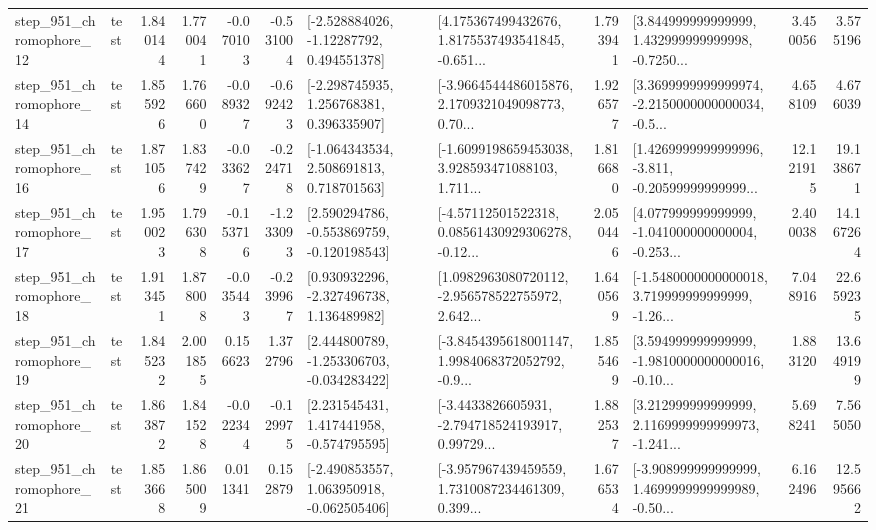 \begin{tabular}{llrrrrllrlrr}
  step\_951\_chromophore\_12 &      test &      1.840144 &    1.770041 &     -0.070103 & -0.531004 &    [-2.528884026, -1.12287792, 0.494551378] &  [4.175367499432676, 1.8175537493541845, -0.651... &       1.793941 &  [3.844999999999999, 1.432999999999998, -0.7250... &            3.450056 &          3.575196 \\
  step\_951\_chromophore\_14 &      test &      1.855926 &    1.766600 &     -0.089327 & -0.692423 &    [-2.298745935, 1.256768381, 0.396335907] &  [-3.9664544486015876, 2.1709321049098773, 0.70... &       1.926577 &  [3.3699999999999974, -2.2150000000000034, -0.5... &            4.658109 &          4.676039 \\
  step\_951\_chromophore\_16 &      test &      1.871056 &    1.837429 &     -0.033627 & -0.224718 &    [-1.064343534, 2.508691813, 0.718701563] &  [-1.6099198659453038, 3.928593471088103, 1.711... &       1.816680 &  [1.4269999999999996, -3.811, -0.20599999999999... &           12.121915 &         19.138671 \\
  step\_951\_chromophore\_17 &      test &      1.950023 &    1.796308 &     -0.153716 & -1.233093 &   [2.590294786, -0.553869759, -0.120198543] &  [-4.57112501522318, 0.08561430929306278, -0.12... &       2.050446 &  [4.077999999999999, -1.041000000000004, -0.253... &            2.400038 &         14.167264 \\
  step\_951\_chromophore\_18 &      test &      1.913451 &    1.878008 &     -0.035443 & -0.239967 &    [0.930932296, -2.327496738, 1.136489982] &  [1.0982963080720112, -2.956578522755972, 2.642... &       1.640569 &  [-1.5480000000000018, 3.719999999999999, -1.26... &            7.048916 &         22.659235 \\
  step\_951\_chromophore\_19 &      test &      1.845232 &    2.001855 &      0.156623 &  1.372796 &   [2.444800789, -1.253306703, -0.034283422] &  [-3.8454395618001147, 1.9984068372052792, -0.9... &       1.855469 &  [3.594999999999999, -1.9810000000000016, -0.10... &            1.883120 &         13.649199 \\
  step\_951\_chromophore\_20 &      test &      1.863872 &    1.841528 &     -0.022344 & -0.129975 &    [2.231545431, 1.417441958, -0.574795595] &  [-3.4433826605931, -2.794718524193917, 0.99729... &       1.882537 &  [3.212999999999999, 2.1169999999999973, -1.241... &            5.698241 &          7.565050 \\
  step\_951\_chromophore\_21 &      test &      1.853668 &    1.865009 &      0.011341 &  0.152879 &   [-2.490853557, 1.063950918, -0.062505406] &  [-3.957967439459559, 1.7310087234461309, 0.399... &       1.676534 &  [-3.908999999999999, 1.4699999999999989, -0.50... &            6.162496 &         12.595662 \\

\end{tabular}

